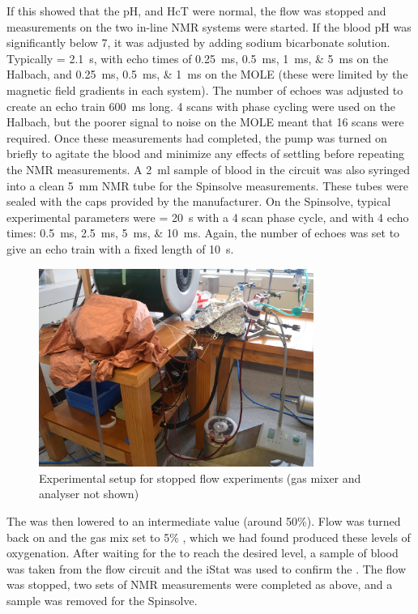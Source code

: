 If this showed that the pH, \SOtwo and HcT were normal, the flow was stopped and measurements on the two in-line NMR systems were started.
If the blood pH was significantly below 7, it was adjusted by adding sodium bicarbonate solution.
Typically \TR = \SI{2.1}{s}, with echo times of \SIlist{0.25;0.5;1;5}{ms} on the Halbach, and \SIlist{0.25; 0.5; 1}{ms} on the MOLE (these were limited by the magnetic field gradients in each system).
The number of echoes was adjusted to create an echo train \SI{600}{ms} long.
4 scans with phase cycling were used on the Halbach, but the poorer signal to noise on the MOLE meant that 16 scans were required.
Once these measurements had completed, the pump was turned on briefly to agitate the blood and minimize any effects of settling before repeating the NMR measurements.
A \SI{2}{ml} sample of blood in the circuit was also syringed into a clean \SI{5}{mm} NMR tube for the Spinsolve measurements.
These tubes were sealed with the caps provided by the manufacturer.
On the Spinsolve, typical experimental parameters were \TR = \SI{20}{s} with a 4 scan phase cycle, and with 4 echo times: \SIlist{0.5;2.5;5;10}{ms}.
Again, the number of echoes was set to give an echo train with a fixed length of \SI{10}{s}.

\begin{figure}[t]
\centering
\includegraphics[width=0.8\textwidth]{figures/stoppedflow/stoppedflowsetup.jpg}
\caption[Experimental setup for stopped flow experiments]{Experimental setup for stopped flow experiments (gas mixer and analyser not shown)}
\label{fig:sf-stoppedflowsetup}
\end{figure}

The \SOtwo was then lowered to an intermediate value (around 50\%).
Flow was turned back on and the gas mix set to 5\% \Otwo, which we had found produced these levels of oxygenation.
After waiting for the \SOtwo to reach the desired level, a sample of blood was taken from the flow circuit and the iStat was used to confirm the \SOtwo.
The flow was stopped, two sets of NMR measurements were completed as above, and a sample was removed for the Spinsolve.

